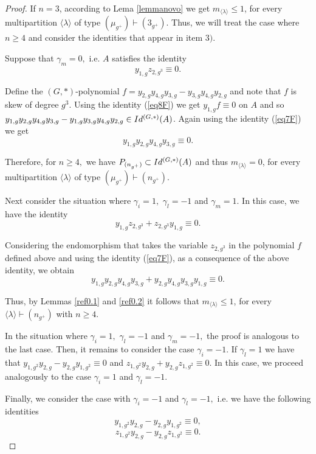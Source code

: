 \documentclass[10pt,a4paper]{amsart}
\newcommand{\IdG}{\ensuremath{\textnormal{Id}^{(G,\ast)}}}
\begin{document}
\begin{proof}
    If $n=3$, according to Lema \ref{lemmanovo} we get $m_{\langle \lambda \rangle}\le 1$, for every multipartition $\langle \lambda \rangle$ of type $(\mu_{g^+})\vdash (3_{g^+})$.  Thus, we will treat the case where $n\geq 4$ and consider the identities that appear in item $3).$  
    
    Suppose that $\gamma_{m}=0,$ i.e. $A$ satisfies the identity 
\begin{equation}\label{eq8F} y_{1,g}z_{2,g^3} \equiv 0.
	\end{equation} 

    Define the $(G,*)$-polynomial $f=y_{2,g}y_{4,g}y_{3,g}-y_{3,g}y_{4,g}y_{2,g}$ and note that $f$ is skew of degree $g^3$. Using the identity (\ref{eq8F}) we get $y_{1,g}f\equiv 0$ on $A$ and so $y_{1,g}y_{2,g}y_{4,g}y_{3,g}-y_{1,g}y_{3,g}y_{4,g}y_{2,g}\in \IdG(A)$. Again using the identity (\ref{eq7F}) we get 
$$y_{1,g}y_{2,g}y_{4,g}y_{3,g}\equiv 0. $$ 

Therefore, for $n\geq 4,$ we have $P_{(n_{g^+})}\subset \IdG(A)$ and thus $m_{\langle \lambda \rangle}= 0$, for every multipartition $\langle \lambda \rangle $ of type $(\mu_{g^+})\vdash (n_{g^+})$. 

 Next consider the situation where $\gamma_{i}=1,$ $\gamma_{l}=-1$ and $\gamma_{m}=1$. In this case, we have the identity 
	$$y_{1,g}z_{2,g^3} + z_{2,g^3}y_{1,g}\equiv 0.$$ 
    
    Considering the endomorphism that takes the variable $z_{2,g^3}$ in the polynomial $f$ defined above and using the identity (\ref{eq7F}),  as a consequence of the above identity, we obtain  
\begin{equation}\label{eq9F} y_{1,g}y_{2,g}y_{4,g}y_{3,g}+y_{2,g}y_{4,g}y_{3,g}y_{1,g}\equiv 0.
	\end{equation} 

Thus,  by Lemmas \ref{ref0.1} and \ref{ref0.2} it follows that $m_{\langle \lambda \rangle}\le 1$, for every $\langle \lambda \rangle \vdash (n_{g^+})$ with $n\geq 4.$
	
In the situation where $\gamma_{i}=1,$ $\gamma_{l}=-1$ and $\gamma_{m}=-1,$ 
	the proof is analogous to the last case. 
    Then, it remains to consider the case $\gamma_i=-1.$ 
     If $\gamma_{l}=1$ we have that 
	$y_{1,g^2}y_{2,g}-y_{2,g}y_{1,g^2}\equiv 0$
		and $z_{1,g^2}y_{2,g}+y_{2,g}z_{1,g^2}\equiv 0.$
In this case, we proceed analogously to the case  $\gamma_{i}=1$ and $\gamma_{l}=-1.$ 

Finally, we consider the case with $\gamma_{i}=-1$ and $\gamma_{l}=-1,$ i.e. we have the following identities
	$$y_{1,g^2}y_{2,g}-y_{2,g}y_{1,g^2}\equiv 0,$$
	$$ z_{1,g^2}y_{2,g}-y_{2,g}z_{1,g^2}\equiv 0.$$ 


\end{proof}
\end{document}
